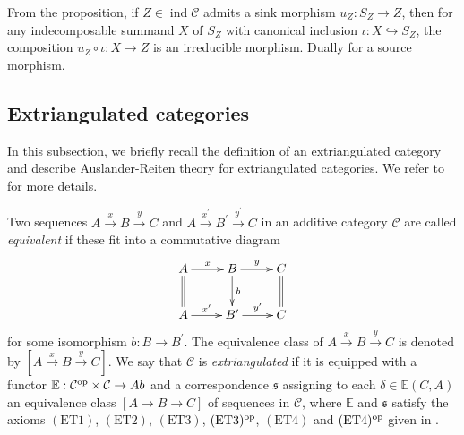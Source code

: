 \documentclass[12pt]{amsart}
\numberwithin{equation}{subsection}
\theoremstyle{plain}
\theoremstyle{definition}
\newcommand{\ind}{\operatorname{ind}}
\newcommand{\C}{\mathcal{C}}
\newcommand{\op}{{\rm op}}
\newcommand{\E}{\mathbb{E}}
\newcommand{\s}{\mathfrak{s}}
\begin{document}
From the proposition, if $Z\in\ind\C$ admits a sink morphism $u_Z:S_Z\to Z$, then for any indecomposable summand $X$ of $S_Z$ with canonical inclusion $\iota: X \hookrightarrow S_Z$, the composition $u_Z \circ \iota: X \to Z$ is an irreducible morphism.
Dually for a source morphism.













\subsection{Extriangulated categories} 
\label{Extriangulated categories}




In this subsection, we briefly recall the definition of an extriangulated category and describe Auslander-Reiten theory for extriangulated categories.
We refer to \cite{Iyama-Nakaoka-Palu_2024,Nakaoka-Palu_2019_extriangulated} for more details.





Two sequences $A \xrightarrow{x} B\xrightarrow{y} C$ and $A \xrightarrow{x^\prime} B^\prime\xrightarrow{y^\prime} C$ in an additive category $\C$ are called {\it equivalent} if these fit into a commutative diagram
\begin{align}
    \xymatrix@M=1mm{
    A \ar[r]^-{x} \ar@{=}[d] & B \ar[r]^-{y} \ar[d]^-{b}& C \ar@{=}[d]\\
    A \ar[r]^-{x^\prime} & B^\prime \ar[r]^-{y^\prime} &C\\ 
    }
\end{align}
for some isomorphism $b:B\to B^\prime$.
The equivalence class of $A \xrightarrow{x} B\xrightarrow{y} C$ is denoted by $[A \xrightarrow{x} B\xrightarrow{y} C]$.
We say that $\C$ is {\it extriangulated} if it is equipped with a functor $\E:\C^\op \times \C \to Ab$ and a correspondence $\s$ assigning to each $\delta\in\E(C,A)$ an equivalence class $[A \to B \to C]$ of sequences in $\C$, where $\E$ and $\s$ satisfy the axioms $(\mathrm{ET}1)$, $(\mathrm{ET}2)$, $(\mathrm{ET}3)$, $(\mathrm{ET}3)^\op$,  $(\mathrm{ET}4)$ and $(\mathrm{ET}4)^\op$ given in \cite[Definition 2.12]{Nakaoka-Palu_2019_extriangulated}.
\end{document}
